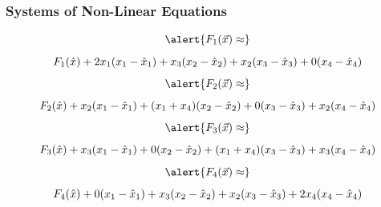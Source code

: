 \documentclass[xcolor=dvipsnames]{beamer}
\begin{document}
\begin{frame}
  \frametitle{Systems of Non-Linear Equations}
  \begin{equation}
  \label{eq:ahthaith}
\alert{F_{1}(\vec{x})\approx}\notag
\end{equation}
\begin{equation}
  \label{eq:weeghifi}
F_{1}(\hat{x})+2x_{1}(x_{1}-\hat{x}_{1})+x_{3}(x_{2}-\hat{x}_{2})+x_{2}(x_{3}-\hat{x}_{3})+0(x_{4}-\hat{x}_{4})\notag
\end{equation}
\begin{equation}
  \label{eq:cezoorae}
\alert{F_{2}(\vec{x})\approx}\notag
\end{equation}
\begin{equation}
  \label{eq:zahghohm}
F_{2}(\hat{x})+x_{2}(x_{1}-\hat{x}_{1})+(x_{1}+x_{4})(x_{2}-\hat{x}_{2})+0(x_{3}-\hat{x}_{3})+x_{2}(x_{4}-\hat{x}_{4})\notag
\end{equation}
\begin{equation}
  \label{eq:peelaloi}
\alert{F_{3}(\vec{x})\approx}\notag
\end{equation}
\begin{equation}
  \label{eq:thaayain}
F_{3}(\hat{x})+x_{3}(x_{1}-\hat{x}_{1})+0(x_{2}-\hat{x}_{2})+(x_{1}+x_{4})(x_{3}-\hat{x}_{3})+x_{3}(x_{4}-\hat{x}_{4})\notag
\end{equation}
\begin{equation}
  \label{eq:ceijahgh}
\alert{F_{4}(\vec{x})\approx}\notag
\end{equation}
\begin{equation}
  \label{eq:geigiepu}
F_{4}(\hat{x})+0(x_{1}-\hat{x}_{1})+x_{3}(x_{2}-\hat{x}_{2})+x_{2}(x_{3}-\hat{x}_{3})+2x_{4}(x_{4}-\hat{x}_{4})\notag
\end{equation}
\end{frame}
\end{document}

